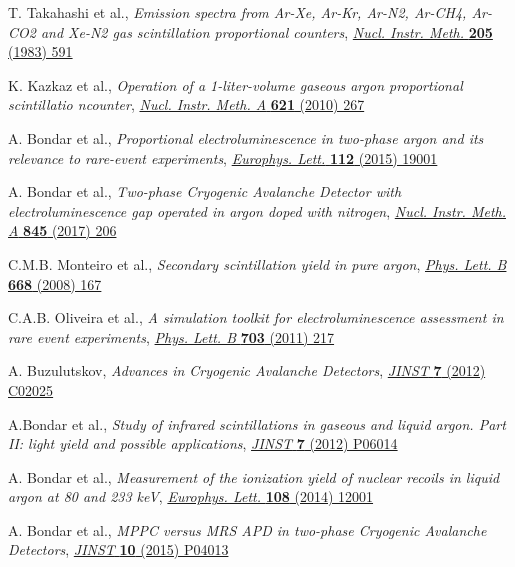 \documentclass[a4paper,11pt]{article}
\begin{document}
\begin{thebibliography}{99}
T. Takahashi et al., \emph{Emission spectra from Ar-Xe, Ar-Kr, Ar-N2, Ar-CH4, Ar-CO2 and Xe-N2 gas scintillation proportional counters}, \href{http://dx.doi.org/10.1016/0167-5087(83)90028-5}{\emph{Nucl. Instr. Meth.} {\bf 205} (1983) 591}

K. Kazkaz et al., \emph{Operation of a 1-liter-volume gaseous argon proportional scintillatio ncounter}, \href{http://dx.doi.org/10.1016/j.nima.2010.06.088}{\emph{Nucl. Instr. Meth. A} {\bf 621} (2010) 267}

A. Bondar et al., \emph{Proportional electroluminescence in two-phase argon and its relevance to rare-event experiments}, \href{http://doi.org/10.1209/0295-5075/112/19001}{\emph{Europhys. Lett.} {\bf 112} (2015) 19001}

A. Bondar et al., \emph{Two-phase Cryogenic Avalanche Detector with electroluminescence gap operated in argon doped with nitrogen}, \href{http://dx.doi.org/10.1016/j.nima.2016.05.109}{\emph{Nucl. Instr. Meth. A} {\bf 845} (2017) 206}

C.M.B. Monteiro et al., \emph{Secondary scintillation yield in pure argon}, \href{http://doi.org/10.1016/j.physletb.2008.08.030}{\emph{Phys. Lett. B} {\bf 668} (2008) 167}

C.A.B. Oliveira et al., \emph{A simulation toolkit for electroluminescence assessment in rare event experiments}, \href{http://doi.org/10.1016/j.physletb.2011.07.081}{\emph{Phys. Lett. B} {\bf 703} (2011) 217}

A. Buzulutskov, \emph{Advances in Cryogenic Avalanche Detectors}, \href{http://dx.doi.org/10.1088/1748-0221/7/02/C02025}{\emph{JINST} {\bf 7} (2012) C02025}

A.Bondar et al., \emph{Study of infrared scintillations in gaseous and liquid argon. Part II: light yield and possible applications}, \href{http://doi.org/10.1088/1748-0221/7/06/P06014}{\emph{JINST} {\bf 7} (2012) P06014}

A. Bondar et al., \emph{Measurement of the ionization yield of nuclear recoils in liquid argon at 80 and 233 keV}, \href{http://doi.org/10.1209/0295-5075/108/12001}{\emph{Europhys. Lett.} {\bf 108} (2014) 12001}

A. Bondar et al., \emph{MPPC versus MRS APD in two-phase Cryogenic Avalanche Detectors}, \href{http://dx.doi.org/10.1088/1748-0221/10/04/P04013}{\emph{JINST} {\bf 10} (2015) P04013}


\end{thebibliography}
\end{document}
